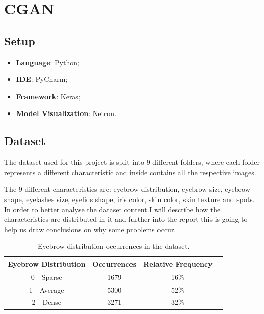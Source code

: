 \documentclass[12pt,a4paper,oneside]{memoir}
\begin{document}
\section{\ac{CGAN}}
    \subsection{Setup}
    \label{sec:cgansetup} 
    \begin{itemize}
            \item \textbf{Language}: Python;
            \item \textbf{\acs{IDE}}: PyCharm; 
            \item \textbf{Framework}: Keras;
            \item \textbf{Model Visualization}: Netron.
    \end{itemize}


    
    \subsection{Dataset}
    \label{sec:cgandata}
    
    The dataset used for this project is split into 9 different folders, where each folder represents a different characteristic and inside contains all the respective images. 
    
    \par
    
    The 9 different characteristics are: eyebrow distribution, eyebrow size, eyebrow shape, eyelashes size, eyelids shape, iris color, skin color, skin texture and spots. In order to better analyse the dataset content I will describe how the characteristics are distributed in it and further into the report this is going to help us draw conclusions on why some problems occur.
    
    
    \begin{table}
    \begin{center}
    \begin{tabular}{ |c|c|c|c| } 
    \hline
    Eyebrow Distribution & Occurrences & Relative Frequency \\
    \hline
         0 - Sparse &  1679 & 16\% \\ 
        1 - Average & 5300 & 52\% \\ 
        2 - Dense & 3271  & 32\% \\ 
    \hline
    \end{tabular}
    \caption{Eyebrow distribution occurrences in the dataset.}
    \label{tab:edrist}
    \end{center}
    \end{table}
    
\end{document}
